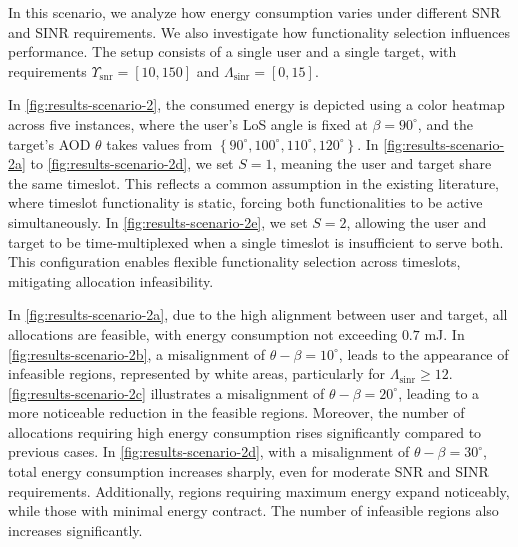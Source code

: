 \documentclass[10pt,journal,compsoc]{IEEEtran}
\theoremstyle{myremark}
\theoremstyle{myexample}
\begin{document}

In this scenario, we analyze how energy consumption varies under different \gls{SNR} and \gls{SINR} requirements. We also investigate how functionality selection influences performance. The setup consists of a single user and a single target, with requirements $ \Upsilon_{\mathrm{snr}} = \left[ 10, 150 \right]  $ and $ \Lambda_{\mathrm{sinr}} = \left[ 0, 15 \right] $. 

 
In \cref{fig:results-scenario-2}, the consumed energy is depicted using a color heatmap across five instances, where the user's LoS angle is fixed at $ \beta = 90^\circ $, and the target's  \gls{AOD} $ \theta $ takes values from $ \left\lbrace 90^\circ, 100^\circ, 110^\circ, 120^\circ \right\rbrace $. In \cref{fig:results-scenario-2a} to \cref{fig:results-scenario-2d}, we set $ S = 1 $, meaning the user and target share the same timeslot. This reflects a common assumption in the existing literature, where timeslot functionality is static, forcing both functionalities to be active simultaneously. In \cref{fig:results-scenario-2e}, we set $ S = 2 $, allowing the user and target to be time-multiplexed when a single timeslot is insufficient to serve both. This configuration enables flexible functionality selection across timeslots, mitigating allocation infeasibility.
 

In \cref{fig:results-scenario-2a}, due to the high alignment between user and target, all allocations are feasible, with energy consumption not exceeding $ 0.7 $ mJ. In \cref{fig:results-scenario-2b}, a misalignment of $ \theta - \beta = 10^\circ $, leads to the appearance of infeasible regions, represented by white areas, particularly for $ \Lambda_{\mathrm{sinr}} \geq 12 $. \cref{fig:results-scenario-2c} illustrates a misalignment of $ \theta - \beta = 20^\circ $, leading to a more noticeable reduction in the feasible regions. Moreover, the number of allocations requiring high energy consumption rises significantly compared to  previous cases. In \cref{fig:results-scenario-2d}, with a misalignment of $ \theta - \beta = 30^\circ $, total energy consumption increases sharply, even for moderate \gls{SNR} and \gls{SINR} requirements. Additionally, regions requiring maximum energy expand noticeably, while those with minimal energy contract. The number of infeasible regions also increases significantly. 
\end{document}
